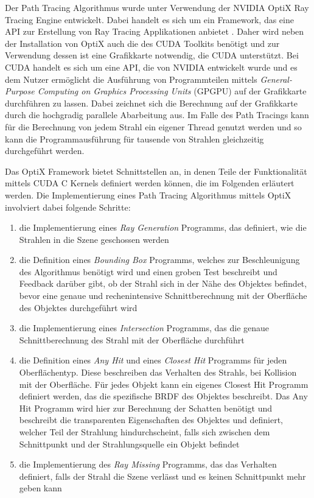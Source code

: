 \documentclass[thesis.tex]{subfiles}
\begin{document}
Der Path Tracing Algorithmus wurde unter Verwendung der NVIDIA OptiX Ray Tracing Engine entwickelt. Dabei handelt es sich um ein Framework, das eine API zur Erstellung von Ray Tracing Applikationen anbietet \cite{bib:Parker2010}. Daher wird neben der Installation von OptiX auch die des CUDA Toolkits benötigt und zur Verwendung dessen ist eine Grafikkarte notwendig, die CUDA unterstützt. Bei CUDA handelt es sich um eine API, die von NVIDIA entwickelt wurde und es dem Nutzer ermöglicht die Ausführung von Programmteilen mittels \emph{General-Purpose Computing on Graphics Processing Units} (GPGPU) auf der Grafikkarte durchführen zu lassen. Dabei zeichnet sich die Berechnung auf der Grafikkarte durch die hochgradig parallele Abarbeitung aus. Im Falle des Path Tracings kann für die Berechnung von jedem Strahl ein eigener Thread genutzt werden und so kann die Programmausführung für tausende von Strahlen gleichzeitig durchgeführt werden.

Das OptiX Framework bietet Schnittstellen an, in denen Teile der Funktionalität mittels CUDA C Kernels definiert werden können, die im Folgenden erläutert werden. Die Implementierung eines Path Tracing Algorithmus mittels OptiX involviert dabei folgende Schritte:
%
\begin{enumerate}
    \item die Implementierung eines \emph{Ray Generation} Programms, das definiert, wie die Strahlen in die Szene geschossen werden
    \item die Definition eines \emph{Bounding Box} Programms, welches zur Beschleunigung des Algorithmus benötigt wird und einen groben Test beschreibt und Feedback darüber gibt, ob der Strahl sich in der Nähe des Objektes befindet, bevor eine genaue und rechenintensive Schnittberechnung mit der Oberfläche des Objektes durchgeführt wird
    \item die Implementierung eines \emph{Intersection} Programms, das die genaue Schnittberechnung des Strahl mit der Oberfläche durchführt
    \item die Definition eines \emph{Any Hit} und eines \emph{Closest Hit} Programms für jeden Oberflächentyp. Diese beschreiben das Verhalten des Strahls, bei Kollision mit der Oberfläche. Für jedes Objekt kann ein eigenes Closest Hit Programm definiert werden, das die spezifische BRDF des Objektes beschreibt. Das Any Hit Programm wird hier zur Berechnung der Schatten benötigt und beschreibt die transparenten Eigenschaften des Objektes und definiert, welcher Teil der Strahlung hindurchscheint, falls sich zwischen dem Schnittpunkt und der Strahlungsquelle ein Objekt befindet
    \item die Implementierung des \emph{Ray Missing} Programms, das das Verhalten definiert, falls der Strahl die Szene verlässt und es keinen Schnittpunkt mehr geben kann
\end{enumerate}
\end{document}
